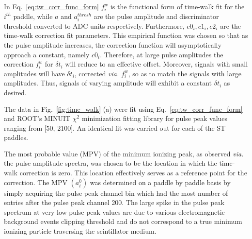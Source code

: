 In Eq.~\ref{eq:tw_corr_func_form} $f^{w}_{i}$ is the functional form of time-walk fit for the $i^{th}$ paddle, while $a$ and $a^{thresh}_{i}$ are the pulse amplitude and discriminator threshold converted to ADC units respectively.  Furthermore, $c0_{i}, c1_{i}, c2_{i}$ are the time-walk correction fit parameters.  This empirical function was chosen so that as the pulse amplitude increases, the correction function will asymptotically approach a constant, namely $c0_{i}$.  Therefore, at large pulse amplitudes the correction $f^{w}_{i}$ for $\delta t_{i}$ will reduce to an effective offset.  Moreover, signals with small amplitudes will have $\delta t_{i}$, corrected \textit{via.} $f^{w}_{i}$, so as to match the signals with large amplitudes.  Thus, signals of varying amplitude will exhibit a constant $\delta t_{i}$ as desired.

The data in Fig.~\ref{fig:time_walk} (a) were fit using Eq.~\ref{eq:tw_corr_func_form} and ROOT's MINUIT $\chi^{2}$ minimization fitting library \cite{root_minuit} for pulse peak values ranging from [50, 2100].  An identical fit was carried out for each of the ST paddles.


The most probable value (MPV) of the minimum ionizing peak, as observed \textit{via.} the pulse amplitude spectra, was chosen to be the location in which the time-walk correction is zero.  This location effectively serves as a reference point for the correction.  
The MPV $(a^{0}_{i})$ was determined on a paddle by paddle basis by simply acquiring the pulse peak channel bin which had the most number of entries after the pulse peak channel 200.  The large spike in the pulse peak spectrum at very low pulse peak values are due to various electromagnetic background events clipping threshold and do not correspond to a true minimum ionizing particle traversing the scintillator medium.

